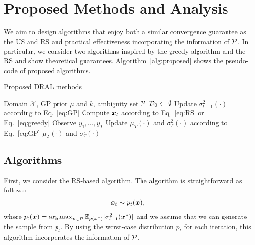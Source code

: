 \section{Proposed Methods and Analysis}
\label{sec:proposed}

We aim to design algorithms that enjoy both a similar convergence guarantee as the US and RS and practical effectiveness incorporating the information of ${\cal P}$.
%
In particular, we consider two algorithms inspired by the greedy algorithm and the RS and show theoretical guarantees.
%
Algorithm~\ref{alg:proposed} shows the pseudo-code of proposed algorithms.


\begin{algorithm}[!t]
    \caption{Proposed DRAL methods}\label{alg:proposed}
    \begin{algorithmic}[1]
        \Require Domain ${\cal X}$, GP prior $\mu$ and $k$, ambiguity set ${\cal P}$
        \State ${\cal D}_{0} \gets \emptyset$
            \State Update $\sigma_{t-1}^2 (\cdot)$ according to Eq.~\eqref{eq:GP}
            \State Compute $\boldsymbol{x}_t$ according to Eq.~\eqref{eq:RS} or Eq.~\eqref{eq:greedy}
        \EndFor
        \State Observe $y_1, \dots, y_T$ 
        \State Update $\mu_{T} (\cdot)$ and $\sigma_{T}^2 (\cdot)$ according to Eq.~\eqref{eq:GP}
        \State \Return $\mu_{T} (\cdot)$ and $\sigma_{T}^2 (\cdot)$
    \end{algorithmic}
\end{algorithm}



\subsection{Algorithms}

First, we consider the RS-based algorithm.
%
The algorithm is straightforward as follows:
\begin{align}
    \boldsymbol{x}_t \sim p_t(\boldsymbol{x}),
    \label{eq:RS}
\end{align}
where $p_t(\boldsymbol{x}) = \operatorname*{arg\,max}_{p \in {\cal P}} \mathbb{E}_{p(\boldsymbol{x}^{*})}[\sigma_{t-1}^2 (\boldsymbol{x}^{*})]$ and we assume that we can generate the sample from $p_t$.
%
By using the worst-case distribution $p_t$ for each iteration, this algorithm incorporates the information of ${\cal P}$.




